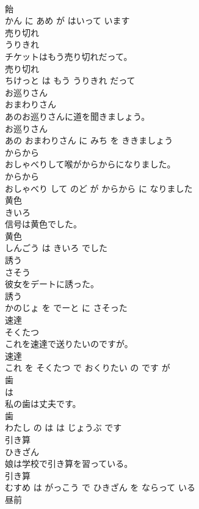 \documentclass[8pt]{extreport}
\begin{document}
\begin{CJK}{UTF8}{min}
\\	飴 
\\	かん に あめ が はいって います			
\\	売り切れ	
\\	うりきれ			
\\	チケットはもう売り切れだって。	
\\	売り切れ 
\\	ちけっと は もう うりきれ だって			
\\	お巡りさん	
\\	おまわりさん			
\\	あのお巡りさんに道を聞きましょう。	
\\	お巡りさん 
\\	あの おまわりさん に みち を ききましょう			
\\	からから	
\\	おしゃべりして喉がからからになりました。	
\\	からから 
\\	おしゃべり して のど が からから に なりました			
\\	黄色	
\\	きいろ			
\\	信号は黄色でした。	
\\	黄色 
\\	しんごう は きいろ でした			
\\	誘う	
\\	さそう			
\\	彼女をデートに誘った。	
\\	誘う 
\\	かのじょ を でーと に さそった			
\\	速達	
\\	そくたつ			
\\	これを速達で送りたいのですが。	
\\	速達 
\\	これ を そくたつ で おくりたい の です が			
\\	歯	
\\	は			
\\	私の歯は丈夫です。	
\\	歯 
\\	わたし の は は じょうぶ です			
\\	引き算	
\\	ひきざん			
\\	娘は学校で引き算を習っている。	
\\	引き算 
\\	むすめ は がっこう で ひきざん を ならって いる			
\\	昼前	

\end{CJK}
\end{document}
